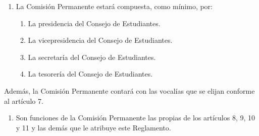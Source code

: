 \documentclass[11pt,a4paper]{article}
\begin{document}

\begin{enumerate}
\item La Comisión Permanente estará compuesta, como mínimo, por:
  \begin{enumerate}
    \item La presidencia del Consejo de Estudiantes.
    \item La vicepresidencia del Consejo de Estudiantes.
    \item La secretaría del Consejo de Estudiantes.
    \item La tesorería del Consejo de Estudiantes.
  \end{enumerate}
\end{enumerate}
Además, la Comisión Permanente contará con las vocalías que se elijan conforme al artículo 7.

\begin{enumerate}[resume]
\item Son funciones de la Comisión Permanente las propias de los artículos 8, 9, 10 y 11 y las demás que le atribuye este Reglamento.
\end{enumerate}
\end{document}
